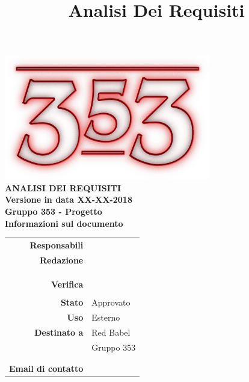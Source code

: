 \documentclass[openany, a4paper, 12pt]{report}
\title{Analisi Dei Requisiti}
\begin{document}
\begin{titlepage}
	\centering
	\vfill
	{
		\bfseries
		\vskip2cm
		\includegraphics[width=9cm]{../../common/images/logo.png} \\
		\vfill
		\Huge{ANALISI DEI REQUISITI}\\
		\vfill
		\Large Versione \vrdue in data XX-XX-2018\\
		\large Gruppo 353 - Progetto \progetto \\
		\vfill
\normalsize Informazioni sul documento\\

\begin{table}[htbp]
	\centering
	\renewcommand\arraystretch{1.2}
	\begin{tabular}{r|l}
		\hline
		\textbf{Responsabili}	& \Elena \\
								
		
		\textbf{Redazione} 		& \Mirco\\
								& \Gianluca\\
								& \Parwinder\\
								& \Valentina\\
		
		\textbf{Verifica} 		& \Riccardo\\
								& \Davide\\
						
		\textbf{Stato} 			& Approvato\\
		\textbf{Uso}			& Esterno\\
		\textbf{Destinato a}   	& Red Babel\\
								& Gruppo 353\\
								& \Vardanega\\
								& \Cardin\\
		
						
			\textbf{Email di contatto}	& \mailgroup
	\end{tabular}
\end{table}
		\vfill
	}    
\end{titlepage}

\tableofcontents
\listoffigures

\listoftables

\newpage
{}




 
\end{document}
